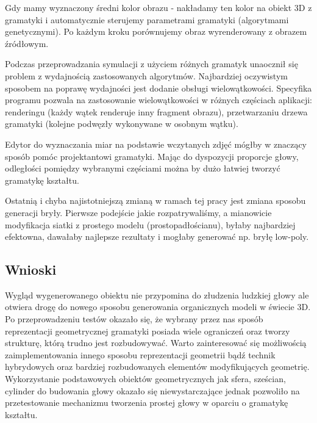 Gdy mamy wyznaczony średni kolor obrazu - nakładamy ten kolor na obiekt 3D z
gramatyki i automatycznie sterujemy parametrami gramatyki (algorytmami
genetycznymi). Po każdym kroku porównujemy obraz wyrenderowany z obrazem
źródłowym.

Podczas przeprowadzania symulacji z użyciem różnych gramatyk unaocznił się
problem z wydajnością zastosowanych algorytmów. Najbardziej oczywistym
sposobem na poprawę wydajności jest dodanie obsługi wielowątkowości. Specyfika
programu pozwala na zastosowanie wielowątkowości w różnych częściach
aplikacji: renderingu (każdy wątek renderuje inny fragment obrazu),
przetwarzaniu drzewa gramatyki (kolejne podwęzły wykonywane w osobnym wątku).

Edytor do wyznaczania miar na podstawie wczytanych zdjęć mógłby w znaczący
sposób pomóc projektantowi gramatyki. Mając do dyspozycji proporcje głowy,
odległości pomiędzy wybranymi częściami można by dużo łatwiej tworzyć gramatykę
kształtu.

Ostatnią i chyba najistotniejszą zmianą w ramach tej pracy jest zmiana sposobu
generacji bryły. Pierwsze podejście jakie rozpatrywaliśmy, a mianowicie
modyfikacja siatki z prostego modelu (prostopadłościanu), byłaby najbardziej
efektowna, dawałaby najlepsze rezultaty i mogłaby generować np. bryłę low-poly.
\subsection{Wnioski}
Wygląd wygenerowanego obiektu nie przypomina do złudzenia ludzkiej głowy ale
otwiera drogę do nowego sposobu generowania organicznych modeli w świecie 3D. Po
przeprowadzeniu testów okazało się, że wybrany przez nas sposób reprezentacji
geometrycznej gramatyki posiada wiele ograniczeń oraz tworzy strukturę, którą
trudno jest rozbudowywać. Warto zainteresować się możliwością zaimplementowania
innego sposobu reprezentacji geometrii bądź technik hybrydowych oraz bardziej
rozbudowanych elementów modyfikujących geometrię.
Wykorzystanie podstawowych obiektów geometrycznych jak sfera, sześcian,
cylinder do budowania głowy okazało się niewystarczające jednak pozwoliło na
przetestowanie mechanizmu tworzenia prostej głowy w oparciu o gramatykę
kształtu.
